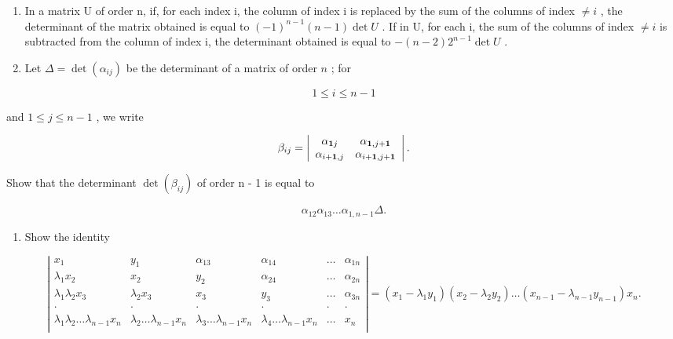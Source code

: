 \BourbakiExercisesSection

\begin{enumerate}
\def\labelenumi{\arabic{enumi}.}
\item
  In a matrix U of order n, if, for each index i, the column of index i is replaced by the sum of the columns of index \(\neq i\) , the determinant of the matrix obtained is equal to \((-1)^{n-1}(n-1)\det U\) . If in U, for each i, the sum of the columns of index \(\neq i\) is subtracted from the column of index i, the determinant obtained is equal to \(-(n-2)2^{n-1}\det U\) .
\item
  Let \(\Delta = \det (\alpha_{ij})\) be the determinant of a matrix of order \(n\) ; for
\end{enumerate}

\[
1 \leqslant i \leqslant n - 1
\]

and \(1 \leqslant j \leqslant n - 1\) , we write

\[
\beta_ {i j} = \left| \begin{array}{c c} \alpha_ {\mathbf {1} j} & \alpha_ {\mathbf {1}, j + \mathbf {1}} \\ \alpha_ {i + \mathbf {1}, j} & \alpha_ {i + \mathbf {1}, j + \mathbf {1}} \end{array} \right|.
\]

Show that the determinant \(\det(\beta_{ij})\) of order n - 1 is equal to

\[
\alpha_ {1 2} \alpha_ {1 3} \dots \alpha_ {1, n - 1} \Delta .
\]

\begin{enumerate}
\def\labelenumi{\arabic{enumi}.}
\setcounter{enumi}{2}
\tightlist
\item
  Show the identity
\end{enumerate}

\[
\left| \begin{array}{cccccc} x _ {1} & y _ {1} & \alpha_ {1 3} & \alpha_ {1 4} & \ldots & \alpha_ {1 n} \\ \lambda_ {1} x _ {2} & x _ {2} & y _ {2} & \alpha_ {2 4} & \ldots & \alpha_ {2 n} \\ \lambda_ {1} \lambda_ {2} x _ {3} & \lambda_ {2} x _ {3} & x _ {3} & y _ {3} & \ldots & \alpha_ {3 n} \\ \cdot & \cdot & \cdot & \cdot & \cdot & \cdot \\ \lambda_ {1} \lambda_ {2} \ldots \lambda_ {n - 1} x _ {n} & \lambda_ {2} \ldots \lambda_ {n - 1} x _ {n} & \lambda_ {3} \ldots \lambda_ {n - 1} x _ {n} & \lambda_ {4} \ldots \lambda_ {n - 1} x _ {n} & \ldots & x _ {n} \\ \end{array} \right| = (x _ {1} - \lambda_ {1} y _ {1}) (x _ {2} - \lambda_ {2} y _ {2}) \ldots (x _ {n - 1} - \lambda_ {n - 1} y _ {n - 1}) x _ {n}.
\]

